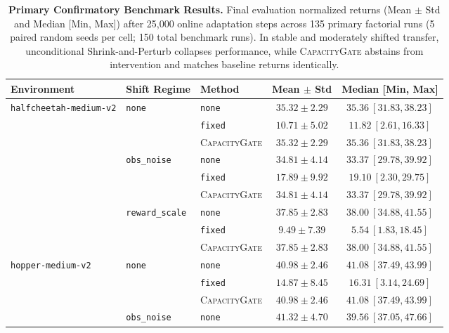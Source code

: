 \documentclass{article}
\begin{document}
\begin{table}[t]
\caption{\textbf{Primary Confirmatory Benchmark Results.} Final evaluation normalized returns (Mean $\pm$ Std and Median [Min, Max]) after 25,000 online adaptation steps across 135 primary factorial runs (5 paired random seeds per cell; 150 total benchmark runs). In stable and moderately shifted transfer, unconditional Shrink-and-Perturb collapses performance, while \textsc{CapacityGate} abstains from intervention and matches baseline returns identically.}
\label{tab:main_results}
\centering
\scriptsize
\begin{tabular}{lllc@{\hskip 0.15in}c}
\toprule
\textbf{Environment} & \textbf{Shift Regime} & \textbf{Method} & \textbf{Mean $\pm$ Std} & \textbf{Median [Min, Max]} \\
\midrule
\multirow{3}{*}{\texttt{halfcheetah-medium-v2}} & \multirow{3}{*}{\texttt{none}} 
  & \texttt{none} & $35.32 \pm 2.29$ & $35.36\ [31.83, 38.23]$ \\
  & & \texttt{fixed} & $10.71 \pm 5.02$ & $11.82\ [2.61, 16.33]$ \\
  & & \textsc{CapacityGate} & $\mathbf{35.32} \pm \mathbf{2.29}$ & $35.36\ [31.83, 38.23]$ \\
\cmidrule{2-5}
  & \multirow{3}{*}{\texttt{obs\_noise}} 
  & \texttt{none} & $34.81 \pm 4.14$ & $33.37\ [29.78, 39.92]$ \\
  & & \texttt{fixed} & $17.89 \pm 9.92$ & $19.10\ [2.30, 29.75]$ \\
  & & \textsc{CapacityGate} & $\mathbf{34.81} \pm \mathbf{4.14}$ & $33.37\ [29.78, 39.92]$ \\
\cmidrule{2-5}
  & \multirow{3}{*}{\texttt{reward\_scale}} 
  & \texttt{none} & $37.85 \pm 2.83$ & $38.00\ [34.88, 41.55]$ \\
  & & \texttt{fixed} & $9.49 \pm 7.39$ & $5.54\ [1.83, 18.45]$ \\
  & & \textsc{CapacityGate} & $\mathbf{37.85} \pm \mathbf{2.83}$ & $38.00\ [34.88, 41.55]$ \\
\midrule
\multirow{3}{*}{\texttt{hopper-medium-v2}} & \multirow{3}{*}{\texttt{none}} 
  & \texttt{none} & $40.98 \pm 2.46$ & $41.08\ [37.49, 43.99]$ \\
  & & \texttt{fixed} & $14.87 \pm 8.45$ & $16.31\ [3.14, 24.69]$ \\
  & & \textsc{CapacityGate} & $\mathbf{40.98} \pm \mathbf{2.46}$ & $41.08\ [37.49, 43.99]$ \\
\cmidrule{2-5}
  & \multirow{3}{*}{\texttt{obs\_noise}} 
  & \texttt{none} & $41.32 \pm 4.70$ & $39.56\ [37.05, 47.66]$ \\

\end{tabular}
\end{table}
\end{document}
